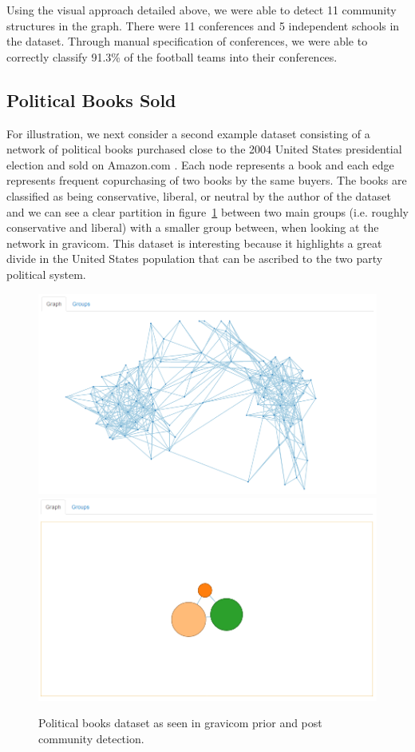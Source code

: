 \documentclass{article}\usepackage[]{graphicx}\usepackage[]{color}
\begin{document}
Using the visual approach detailed above, we were able to detect 11 community structures in the graph. There were 11 conferences and 5 independent schools in the dataset. Through manual specification of conferences, we were able to correctly classify 91.3\% of the football teams into their conferences. 

\subsection{Political Books Sold}
For illustration, we next consider a second example dataset consisting of a network of political books purchased close to the 2004 United States presidential election and sold on Amazon.com \cite{polbooks}. Each node represents a book and each edge represents frequent copurchasing of two books by the same buyers. The books are classified as being conservative, liberal, or neutral by the author of the dataset \cite{krebs2004divided} and we can see a clear partition in figure~\ref{fig:polbooks_1} between two main groups (i.e. roughly conservative and liberal) with a smaller group between, when looking at the network in gravicom. This dataset is interesting because it highlights a great divide in the United States population that can be ascribed to the two party political system. 

\begin{figure}[H]
\centering
\includegraphics[width=\textwidth]{images/polbooks_1.png}
\includegraphics[width=\textwidth]{images/polbooks_2.png}
\caption{\label{fig:polbooks_1} Political books dataset as seen in gravicom prior and post community detection.}
\end{figure}
\end{document}
